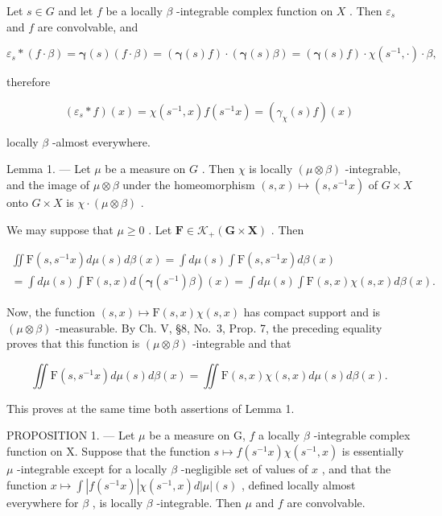 Let \(s \in G\) and let \(f\) be a locally \(\beta\) -integrable complex function on \(X\) . Then \(\varepsilon_s\) and \(f\) are convolvable, and

\[
\varepsilon_ {s} * (f \cdot \beta) = \boldsymbol {\gamma} (s) (f \cdot \beta) = (\boldsymbol {\gamma} (s) f) \cdot (\boldsymbol {\gamma} (s) \beta) = (\boldsymbol {\gamma} (s) f) \cdot \chi (s ^ {- 1}, \cdot) \cdot \beta ,
\]

therefore

\[
\left(\varepsilon_ {s} * f\right) (x) = \chi \left(s ^ {- 1}, x\right) f \left(s ^ {- 1} x\right) = \left(\gamma_ {\chi} (s) f\right) (x)\tag{2}
\]

locally \(\beta\) -almost everywhere.

Lemma 1. --- Let \(\mu\) be a measure on \(G\) . Then \(\chi\) is locally \((\mu \otimes \beta)\) -integrable, and the image of \(\mu \otimes \beta\) under the homeomorphism \((s, x) \mapsto (s, s^{-1}x)\) of \(G \times X\) onto \(G \times X\) is \(\chi \cdot (\mu \otimes \beta)\) .

We may suppose that \(\mu \geqslant 0\) . Let \(\mathbf{F} \in \mathcal{K}_{+}(\mathbf{G} \times \mathbf{X})\) . Then

\[
\begin{array}{l} \iint \mathrm{F} (s, s ^ {- 1} x) d \mu (s) d \beta (x) = \int d \mu (s) \int \mathrm{F} (s, s ^ {- 1} x) d \beta (x) \\ = \int d \mu (s) \int \mathrm{F} (s, x) d (\boldsymbol {\gamma} (s ^ {- 1}) \beta) (x) = \int d \mu (s) \int \mathrm{F} (s, x) \chi (s, x) d \beta (x). \end{array}
\]

Now, the function \((s,x)\mapsto\mathrm{F}(s,x)\chi(s,x)\) has compact support and is \((\mu\otimes\beta)\) -measurable. By Ch. V, §8, No.~3, Prop. 7, the preceding equality proves that this function is \((\mu\otimes\beta)\) -integrable and that

\[
\iint \mathrm{F} (s, s ^ {- 1} x) d \mu (s) d \beta (x) = \iint \mathrm{F} (s, x) \chi (s, x) d \mu (s) d \beta (x).
\]

This proves at the same time both assertions of Lemma 1.

PROPOSITION 1. --- Let \(\mu\) be a measure on G, \(f\) a locally \(\beta\) -integrable complex function on X. Suppose that the function \(s \mapsto f(s^{-1}x)\chi(s^{-1}, x)\) is essentially \(\mu\) -integrable except for a locally \(\beta\) -negligible set of values of \(x\) , and that the function \(x \mapsto \int |f(s^{-1}x)| \chi(s^{-1}, x) d|\mu|(s)\) , defined locally almost everywhere for \(\beta\) , is locally \(\beta\) -integrable. Then \(\mu\) and \(f\) are convolvable.

